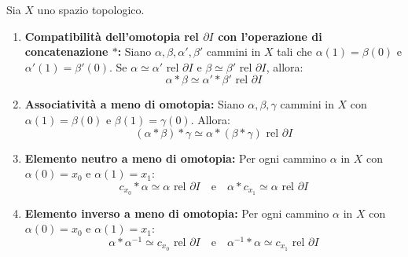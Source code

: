 \vspace{1.5em}

\begin{teo}
Sia $X$ uno spazio topologico.
\begin{enumerate}[label=\alph*)]
    \item \textbf{Compatibilità dell'omotopia rel $\partial I$ con l'operazione di concatenazione $*$:}
    Siano $\alpha, \beta, \alpha', \beta'$ cammini in $X$ tali che $\alpha(1) = \beta(0)$ e $\alpha'(1) = \beta'(0)$.
    Se $\alpha \simeq \alpha' \text{ rel } \partial I$ e $\beta \simeq \beta' \text{ rel } \partial I$, allora:
    \[
    \alpha * \beta \simeq \alpha' * \beta' \text{ rel } \partial I
    \]

    \item \textbf{Associatività a meno di omotopia:}
    Siano $\alpha, \beta, \gamma$ cammini in $X$ con $\alpha(1) = \beta(0)$ e $\beta(1) = \gamma(0)$. Allora:
    \[
    (\alpha * \beta) * \gamma \simeq \alpha * (\beta * \gamma) \text{ rel } \partial I
    \]

    \item \textbf{Elemento neutro a meno di omotopia:}
    Per ogni cammino $\alpha$ in $X$ con $\alpha(0) = x_0$ e $\alpha(1) = x_1$:
    \[
    c_{x_0} * \alpha \simeq \alpha \text{ rel } \partial I \quad \text{e} \quad \alpha * c_{x_1} \simeq \alpha \text{ rel } \partial I
    \]

    \item \textbf{Elemento inverso a meno di omotopia:}
    Per ogni cammino $\alpha$ in $X$ con $\alpha(0) = x_0$ e $\alpha(1) = x_1$:
    \[
    \alpha * \alpha^{-1} \simeq c_{x_0} \text{ rel } \partial I \quad \text{e} \quad \alpha^{-1} * \alpha \simeq c_{x_1} \text{ rel } \partial I
    \]
\end{enumerate}
\end{teo}

